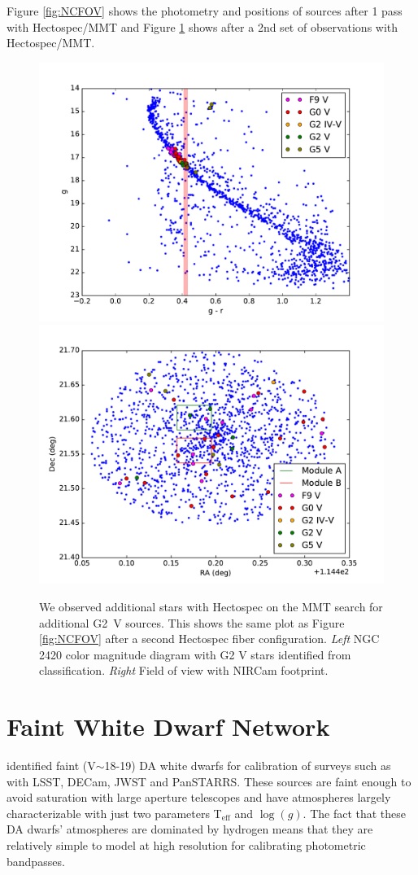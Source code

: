 \documentclass{aastex6}
\begin{document}
Figure \ref{fig:NCFOV} shows the photometry and positions of sources after 1 pass with Hectospec/MMT and Figure \ref{fig:NCFOV2ndrun} shows after a 2nd set of observations with Hectospec/MMT.

\begin{figure}[!hbtp]
\centering
\includegraphics[width=.49\columnwidth]{colormag_two_runs.pdf}
\includegraphics[width=.49\columnwidth]{fov_ngc2420_two_runs.pdf}
\caption{We observed additional stars with Hectospec on the MMT search for additional G2~V sources. This shows the same plot as Figure \ref{fig:NCFOV} after a second Hectospec fiber configuration.
{\it Left} NGC 2420 color magnitude diagram with G2 V stars identified from classification. {\it Right} Field of view with NIRCam footprint.}\label{fig:NCFOV2ndrun}
\end{figure}

\clearpage

\section{Faint White Dwarf Network}
\citet{narayan2016wdnetwork} identified faint (V$\sim$18-19) DA white dwarfs for calibration of surveys such as with LSST, DECam, JWST and PanSTARRS.
These sources are faint enough to avoid saturation with large aperture telescopes and have atmospheres largely characterizable with just two parameters T$_\mathrm{eff}$ and $\log(g)$.
The fact that these DA dwarfs' atmospheres are dominated by hydrogen means that they are relatively simple to model at high resolution for calibrating photometric bandpasses.
\end{document}
